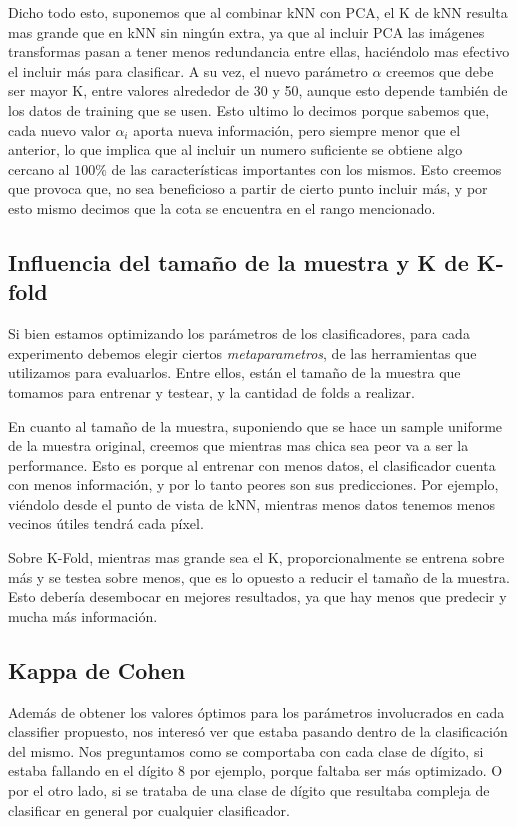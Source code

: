 \documentclass[a4paper]{article}
\begin{document}
    Dicho todo esto, suponemos que al combinar kNN con PCA, el K de kNN resulta mas grande que en kNN sin ningún extra, ya que al incluir PCA las imágenes transformas pasan a tener menos redundancia entre ellas, haciéndolo mas efectivo el incluir más para clasificar. A su vez, el nuevo parámetro $\alpha$ creemos que debe ser mayor K, entre valores alrededor de 30 y 50, aunque esto depende también de los datos de training que se usen. Esto ultimo lo decimos porque sabemos que, cada nuevo valor $\alpha_i$ aporta nueva información, pero siempre menor que el anterior, lo que implica que al incluir un numero suficiente se obtiene algo cercano al $100\%$ de las características importantes con los mismos. Esto creemos que provoca que, no sea beneficioso a partir de cierto punto incluir más, y por esto mismo decimos que la cota se encuentra en el rango mencionado.

    \subsection{Influencia del tamaño de la muestra y K de K-fold}\label{exp-sample-size}
    Si bien estamos optimizando los parámetros de los clasificadores, para cada experimento debemos elegir ciertos \textit{metaparametros}, de las herramientas que utilizamos para evaluarlos. Entre ellos, están el tamaño de la muestra que tomamos para entrenar y testear, y la cantidad de folds a realizar.
    
    En cuanto al tamaño de la muestra, suponiendo que se hace un sample uniforme de la muestra original, creemos que mientras mas chica sea peor va a ser la performance. Esto es porque al entrenar con menos datos, el clasificador cuenta con menos información, y por lo tanto peores son sus predicciones. Por ejemplo, viéndolo desde el punto de vista de kNN, mientras menos datos tenemos menos vecinos útiles tendrá cada píxel.
    
    Sobre K-Fold, mientras mas grande sea el K, proporcionalmente se entrena sobre más y se testea sobre menos, que es lo opuesto a reducir el tamaño de la muestra. Esto debería desembocar en mejores resultados, ya que hay menos que predecir y mucha más información.
    
    \subsection{Kappa de Cohen}
    
    Además de obtener los valores óptimos para los parámetros involucrados en cada classifier propuesto, nos interesó ver que estaba pasando dentro de la clasificación del mismo. Nos preguntamos como se comportaba con cada clase de dígito, si estaba fallando en el dígito 8 por ejemplo, porque faltaba ser más optimizado. O por el otro lado, si se trataba de una clase de dígito que resultaba compleja de clasificar en general por cualquier clasificador.
    
\end{document}
